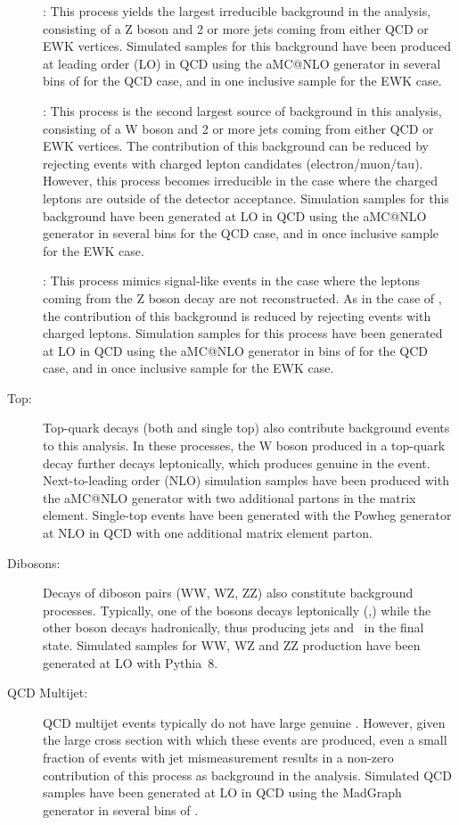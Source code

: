 \begin{description}
\item[\Zvvjets]: This process yields the largest irreducible background in the analysis, consisting of a Z boson and 2 or more
jets coming from either QCD or EWK vertices. Simulated samples for this background have been produced at leading
order (LO) in QCD using the aMC@NLO generator in several bins of \Ht for the QCD case, and in one inclusive sample for the EWK case.

\item[\Wjets]: This process is the second largest source of background in this analysis, consisting of a W boson and 2 or more
jets coming from either QCD or EWK vertices. The contribution of this background can be reduced by rejecting events with
charged lepton candidates (electron/muon/tau).
However, this process becomes irreducible in the case where the charged leptons are outside of the detector acceptance.
Simulation samples for this background have been generated at LO in QCD using the aMC@NLO generator in several bins \Ht for the QCD case, and in once inclusive sample for the EWK case.

\item[\Zlljets]: This process mimics signal-like events in the case where the leptons coming from the Z boson decay are
not reconstructed. As in the case of \Wlv, the contribution of this background is reduced by rejecting events with charged leptons.
Simulation samples for this process have been generated at LO in QCD using the aMC@NLO generator in bins of \Ht for the QCD case, and in once inclusive sample for the EWK case.

\item[Top:] Top-quark decays (both \ttbar and single top) also contribute background events to this analysis.
In these processes, the W boson produced in a top-quark decay further decays leptonically, which produces genuine \ptmiss in the event.
Next-to-leading order (NLO) \ttbar simulation samples have been produced with the aMC@NLO generator with two additional partons in the matrix element.
Single-top events have been generated with the Powheg generator at NLO in QCD with one additional matrix element parton.

\item[Dibosons:] Decays of diboson pairs (WW, WZ, ZZ) also constitute background processes.
Typically, one of the bosons decays leptonically (\Wlv,\Zvv) while the other boson decays hadronically, thus producing jets and \ptmiss~in the final state.
Simulated samples for WW, WZ and ZZ production have been generated at LO with Pythia~8.

\item[QCD Multijet:] QCD multijet events typically do not have large genuine \ptmiss.
However, given the large cross section with which these events are produced, even a small fraction of events with
jet mismeasurement results in a non-zero contribution of this process as background in the analysis.
Simulated QCD samples have been generated at LO in QCD using the MadGraph generator in several bins of \Ht.

\end{description}

